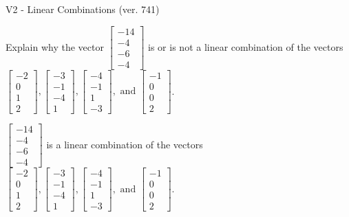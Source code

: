 \begin{exercise}
  \begin{exerciseTitle}V2 - Linear Combinations (ver. 741)\end{exerciseTitle}
  \begin{exerciseStatement}
    Explain why the vector \(\left[\begin{array}{c}
-14 \\
-4 \\
-6 \\
-4
\end{array}\right]\)  is or is not a linear 
	combination of the vectors \(\left[\begin{array}{c}
-2 \\
0 \\
1 \\
2
\end{array}\right] , \left[\begin{array}{c}
-3 \\
-1 \\
-4 \\
1
\end{array}\right] , \left[\begin{array}{c}
-4 \\
-1 \\
1 \\
-3
\end{array}\right] , \text{ and } \left[\begin{array}{c}
-1 \\
0 \\
0 \\
2
\end{array}\right]\).
	


  \end{exerciseStatement}
  \begin{exerciseAnswer}
   \(\left[\begin{array}{c}
-14 \\
-4 \\
-6 \\
-4
\end{array}\right]\) 
  	 is  
	a linear combination of the vectors \(\left[\begin{array}{c}
-2 \\
0 \\
1 \\
2
\end{array}\right] , \left[\begin{array}{c}
-3 \\
-1 \\
-4 \\
1
\end{array}\right] , \left[\begin{array}{c}
-4 \\
-1 \\
1 \\
-3
\end{array}\right] , \text{ and } \left[\begin{array}{c}
-1 \\
0 \\
0 \\
2
\end{array}\right]\).


\end{exerciseAnswer}
\end{exercise}
